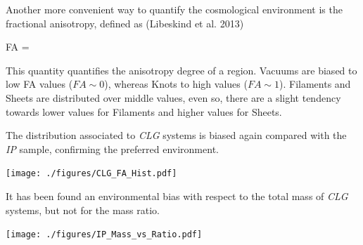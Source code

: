 \documentclass[8pt,fleqn]{beamer}
\begin{document}
\begin{frame}
\begin{tcolorbox}[colback=white!5,colframe=black!75!black,title=Fractional Anisotropy]\justifying

	Another more convenient way to quantify the cosmological environment
	is the fractional anisotropy, defined as (Libeskind et al. 2013)
	
	{ FA =    }

	This quantity quantifies the anisotropy degree of a region.
	Vacuums are biased to low FA values ($FA \sim 0$), whereas Knots to high
	values ($FA \sim 1$). Filaments and Sheets are distributed over middle
	values, even so, there are a slight tendency towards lower values for 
	Filaments and higher values for Sheets. 


\end{tcolorbox}
\end{frame}
\begin{frame}
\begin{tcolorbox}[colback=white!5,colframe=black!75!black,title=Fractional Anisotropy]\justifying

	The distribution associated to \textit{CLG} systems is biased again
	compared with the \textit{IP} sample, confirming the preferred environment.

	\centering
	\texttt{[image: ./figures/CLG\_FA\_Hist.pdf]}
	

\end{tcolorbox}
\end{frame}
\begin{frame}
\begin{tcolorbox}[colback=white!5,colframe=black!75!black,title=Mass of LG-like systems]\justifying

	It has been found an environmental bias with respect to the total mass
	of \textit{CLG} systems, but not for the mass ratio.

	\centering
	\texttt{[image: ./figures/IP\_Mass\_vs\_Ratio.pdf]}
	

\end{tcolorbox}
\end{frame}
\end{document}
